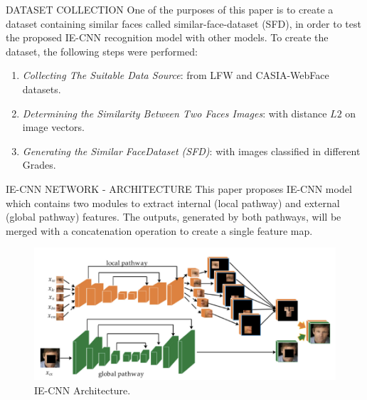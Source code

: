 \begin{frame}{DATASET COLLECTION}
    One of the purposes of this paper is to create a dataset containing similar 
    faces called similar-face-dataset (SFD), in order to test the proposed 
    IE-CNN recognition model with other models. To create the dataset, the 
    following steps were performed:
    \begin{enumerate}
        \item \emph{Collecting The Suitable Data Source}: from LFW and CASIA-WebFace datasets.
        \item \emph{Determining the Similarity Between Two Faces Images}: with distance $L2$ on image vectors.
        \item \emph{Generating the Similar FaceDataset (SFD)}: with images classified in different Grades.
    \end{enumerate}
\end{frame}

\begin{frame}{IE-CNN NETWORK - ARCHITECTURE}
    This paper proposes IE-CNN model which contains two modules to 
    extract internal (local pathway) and external (global pathway) features. 
    The outputs, generated by both pathways, will be merged with a 
    concatenation operation to create a single feature map.
    \begin{figure}[h!]
        \centering
        \includegraphics[width = 0.8\linewidth]{images/paper9/IE-CNN.png}
        \centering
        \caption{IE-CNN Architecture.}
        \label{fig:IE-CNN ARCHITECTURE}
    \end{figure}
\end{frame}

